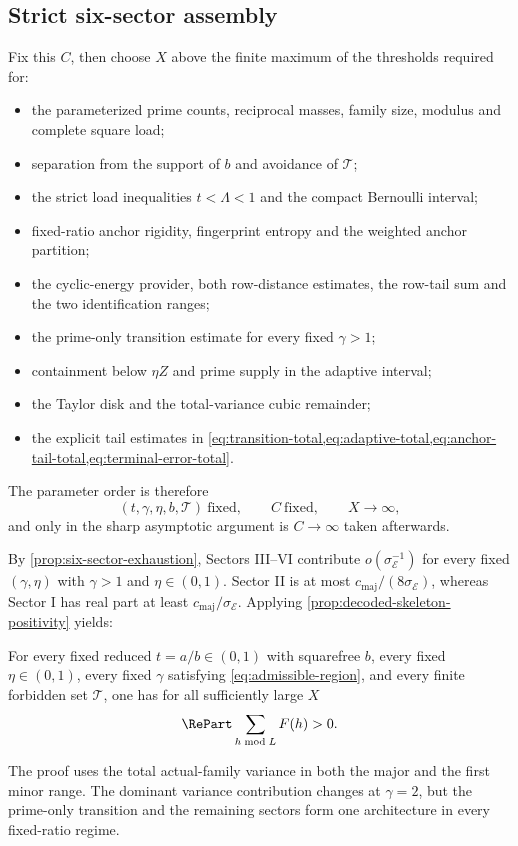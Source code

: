 \subsection{Strict six-sector assembly}

Fix this $C$, then choose $X$ above the finite maximum of the thresholds required for:
\begin{itemize}
\item the parameterized prime counts, reciprocal masses, family size, modulus and complete square load;
\item separation from the support of $b$ and avoidance of $\mathcal T$;
\item the strict load inequalities $t<\Lambda<1$ and the compact Bernoulli interval;
\item fixed-ratio anchor rigidity, fingerprint entropy and the weighted anchor partition;
\item the cyclic-energy provider, both row-distance estimates, the row-tail sum and the two identification ranges;
\item the prime-only transition estimate for every fixed $\gamma>1$;
\item containment below $\eta Z$ and prime supply in the adaptive interval;
\item the Taylor disk and the total-variance cubic remainder;
\item the explicit tail estimates in \cref{eq:transition-total,eq:adaptive-total,eq:anchor-tail-total,eq:terminal-error-total}.
\end{itemize}
The parameter order is therefore
\begin{equation}
\label{eq:parameter-order}
 (t,\gamma,\eta,b,\mathcal T)\ \text{fixed},
 \qquad C\ \text{fixed},
 \qquad X\to\infty,
\end{equation}
and only in the sharp asymptotic argument is $C\to\infty$ taken afterwards.

By \cref{prop:six-sector-exhaustion}, Sectors III--VI contribute $o(\sigma_{\mathcal E}^{-1})$ for every fixed $(\gamma,\eta)$ with $\gamma>1$ and $\eta\in(0,1)$.  Sector II is at most $c_{\mathrm{maj}}/(8\sigma_{\mathcal E})$, whereas Sector I has real part at least $c_{\mathrm{maj}}/\sigma_{\mathcal E}$.  Applying \cref{prop:decoded-skeleton-positivity} yields:

\begin{theorem}
\label{thm:positive-fourier-numerator}
For every fixed reduced $t=a/b\in(0,1)$ with squarefree $b$, every fixed $\eta\in(0,1)$, every fixed $\gamma$ satisfying \cref{eq:admissible-region}, and every finite forbidden set $\mathcal T$, one has for all sufficiently large $X$
\begin{equation}
\label{eq:positive-full-sum}
 \RePart\sum_{h\bmod L}F(h)>0.
\end{equation}
\end{theorem}

The proof uses the total actual-family variance in both the major and the first minor range.  The dominant variance contribution changes at $\gamma=2$, but the prime-only transition and the remaining sectors form one architecture in every fixed-ratio regime.
